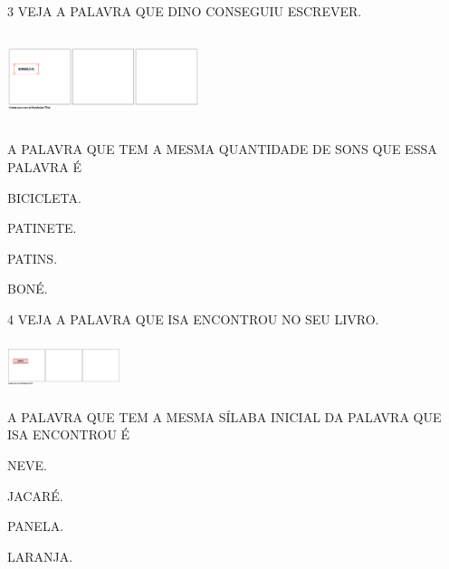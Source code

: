\num{3} VEJA A PALAVRA QUE DINO CONSEGUIU ESCREVER.

\includegraphics[width=2.21250in,height=1.04375in]{media/image243.png}


A PALAVRA QUE TEM A MESMA QUANTIDADE DE SONS QUE ESSA PALAVRA É 

\begin{escolha}
\item BICICLETA.

\item PATINETE.

\item PATINS.

\item BONÉ.
\end{escolha}


\num{4} VEJA A PALAVRA QUE ISA ENCONTROU NO SEU LIVRO. 


\includegraphics[width=1.29722in,height=0.57917in]{media/image244.png}

A PALAVRA QUE TEM A MESMA SÍLABA INICIAL DA PALAVRA QUE ISA ENCONTROU É

\begin{escolha}
\item NEVE.

\item JACARÉ.

\item PANELA.

\item LARANJA.
\end{escolha}


